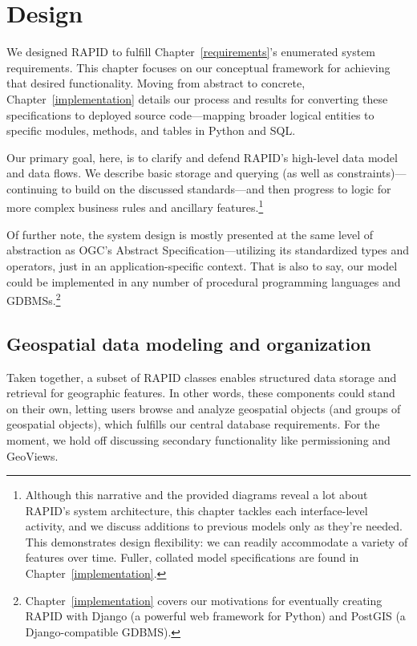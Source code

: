 \chapter{Design}
\label{design}


We designed RAPID to fulfill Chapter~\ref{requirements}'s enumerated system requirements. This chapter focuses on our conceptual framework for achieving that desired functionality. Moving from abstract to concrete, Chapter~\ref{implementation} details our process and results for converting these specifications to deployed source code---mapping broader logical entities to specific modules, methods, and tables in Python and SQL.

Our primary goal, here, is to clarify and defend RAPID's high-level data model and data flows. We describe basic storage and querying (as well as constraints)---continuing to build on the discussed standards---and then progress to logic for more complex business rules and ancillary features.\footnote{Although this narrative and the provided diagrams reveal a lot about RAPID's system architecture, this chapter tackles each interface-level activity, and we discuss additions to previous models only as they're needed. This demonstrates design flexibility: we can readily accommodate a variety of features over time. Fuller, collated model specifications are found in Chapter~\ref{implementation}.}

Of further note, the system design is mostly presented at the same level of abstraction as OGC's Abstract Specification---utilizing its standardized types and operators, just in an application-specific context. That is also to say, our model could be implemented in any number of procedural programming languages and GDBMSs.\footnote{Chapter~\ref{implementation} covers our motivations for eventually creating RAPID with Django (a powerful web framework for Python) and PostGIS (a Django-compatible GDBMS).}

\section{Geospatial data modeling and organization}
Taken together, a subset of RAPID classes enables structured data storage and retrieval for geographic features. In other words, these components could stand on their own, letting users browse and analyze geospatial objects (and groups of geospatial objects), which fulfills our central database requirements. For the moment, we hold off discussing secondary functionality like permissioning and GeoViews.

